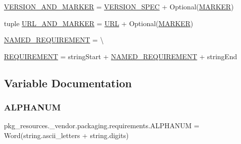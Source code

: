 \begin{DoxyCompactItemize}
\item 
\hyperlink{namespacepkg__resources_1_1__vendor_1_1packaging_1_1requirements_a7bfe7c7039645c83eaf062ad90b82aa3}{V\+E\+R\+S\+I\+O\+N\+\_\+\+A\+N\+D\+\_\+\+M\+A\+R\+K\+ER} = \hyperlink{namespacepkg__resources_1_1__vendor_1_1packaging_1_1requirements_a6ec8597b008780bbfa1fc9a46d392c05}{V\+E\+R\+S\+I\+O\+N\+\_\+\+S\+P\+EC} + Optional(\hyperlink{namespacepkg__resources_1_1__vendor_1_1packaging_1_1requirements_a77c252a4381e3a258ff2b5e3e0b3b80b}{M\+A\+R\+K\+ER})
\item 
tuple \hyperlink{namespacepkg__resources_1_1__vendor_1_1packaging_1_1requirements_afcedccef1033e4aa484ab83cde6fe662}{U\+R\+L\+\_\+\+A\+N\+D\+\_\+\+M\+A\+R\+K\+ER} = \hyperlink{namespacepkg__resources_1_1__vendor_1_1packaging_1_1requirements_ab29530c5f15e4e1befc9399a7063fdfa}{U\+RL} + Optional(\hyperlink{namespacepkg__resources_1_1__vendor_1_1packaging_1_1requirements_a77c252a4381e3a258ff2b5e3e0b3b80b}{M\+A\+R\+K\+ER})
\item 
\hyperlink{namespacepkg__resources_1_1__vendor_1_1packaging_1_1requirements_a3d04a591a1a9760fa3716673d5543993}{N\+A\+M\+E\+D\+\_\+\+R\+E\+Q\+U\+I\+R\+E\+M\+E\+NT} = \textbackslash{}
\item 
\hyperlink{namespacepkg__resources_1_1__vendor_1_1packaging_1_1requirements_a670e5af75bdd81cbcf8bb2a2a322694b}{R\+E\+Q\+U\+I\+R\+E\+M\+E\+NT} = string\+Start + \hyperlink{namespacepkg__resources_1_1__vendor_1_1packaging_1_1requirements_a3d04a591a1a9760fa3716673d5543993}{N\+A\+M\+E\+D\+\_\+\+R\+E\+Q\+U\+I\+R\+E\+M\+E\+NT} + string\+End
\end{DoxyCompactItemize}


\subsection{Variable Documentation}
\mbox{\label{namespacepkg__resources_1_1__vendor_1_1packaging_1_1requirements_a1b6a0f93aab1e0de65e69f84fdd3fc4d}} 
\subsubsection{\texorpdfstring{A\+L\+P\+H\+A\+N\+UM}{ALPHANUM}}
{\footnotesize\ttfamily pkg\+\_\+resources.\+\_\+vendor.\+packaging.\+requirements.\+A\+L\+P\+H\+A\+N\+UM = Word(string.\+ascii\+\_\+letters + string.\+digits)}

